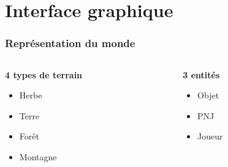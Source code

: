 \documentclass{beamer}
\begin{document}
\section{Interface graphique}

\begin{frame}

   \frametitle{Représentation du monde}
 \begin{columns}[t]
  \begin{column}{5cm}
\textbf{4 types de terrain} \\
\vspace{5mm} 
\begin{itemize}
 \item  Herbe  ~\\
\vspace{5mm} 
 \item   Terre ~ \\
\vspace{5mm} 
 \item  Forêt ~ \\
\vspace{5mm} 
 \item  Montagne 
\end{itemize}
  \end{column}
  
  \begin{column}{5cm}
\textbf{3 entités}
\vspace{5mm} 
\begin{itemize}
 \item  Objet ~ \\
\vspace{5mm} 
 \item  PNJ ~ \\
\vspace{5mm} 
 \item Joueur 
\end{itemize}

  \end{column}
 \end{columns}



\end{frame}
\end{document}

